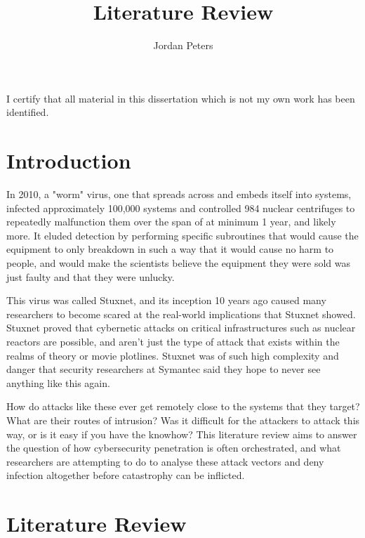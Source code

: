 \documentclass[a4paper, 11pt]{article}
\title{Literature Review}
\author{Jordan Peters}
\begin{document}
\begin{titlepage}
    \maketitle
    I certify that all material in this dissertation which is not my own work has been identified.
\end{titlepage}

\tableofcontents


\pagebreak


\section{Introduction}
In 2010, a "worm" virus, one that spreads across and embeds itself into systems, infected approximately 100,000 systems \cite{ref:stuxnet2011report} and controlled 984 nuclear centrifuges to repeatedly malfunction them \cite{ref:singer2014cybersecurity} over the span of at minimum 1 year, and likely more. \cite{ref:stuxnet2011report} It eluded detection by performing specific subroutines that would cause the equipment to only breakdown in such a way that it would cause no harm to people, and would make the scientists believe the equipment they were sold was just faulty and that they were unlucky. \cite{ref:singer2014cybersecurity}

This virus was called Stuxnet, and its inception 10 years ago caused many researchers to become scared at the real-world implications that Stuxnet showed. \cite{ref:stuxnet2011report,ref:singer2014cybersecurity} Stuxnet proved that cybernetic attacks on critical infrastructures such as nuclear reactors are possible, and aren't just the type of attack that exists within the realms of theory or movie plotlines. \cite{ref:stuxnet2011report} Stuxnet was of such high complexity and danger that security researchers at Symantec said they hope to never see anything like this again. \cite{ref:stuxnet2011report}

How do attacks like these ever get remotely close to the systems that they target? What are their routes of intrusion? Was it difficult for the attackers to attack this way, or is it easy if you have the knowhow? This literature review aims to answer the question of how cybersecurity penetration is often orchestrated, and what researchers are attempting to do to analyse these attack vectors and deny infection altogether before catastrophy can be inflicted.

\section{Literature Review}
\end{document}
